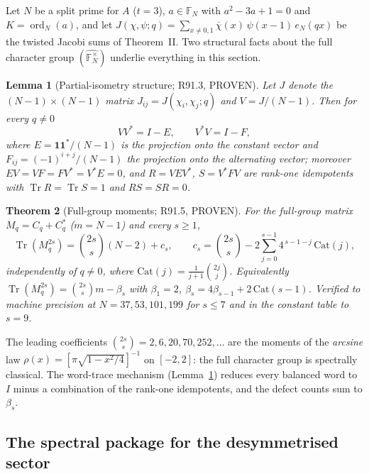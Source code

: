 \documentclass[11pt,reqno]{amsart}
\newtheorem{theorem}{Theorem}[section]
\newtheorem{lemma}[theorem]{Lemma}
\theoremstyle{definition}
\begin{document}
Let $N$ be a split prime for $A$ ($t=3$), $a \in \mathbb{F}_N$ with
$a^2 - 3a + 1 = 0$ and $K = \operatorname{ord}_N(a)$, and let
$J(\chi,\psi;q) = \sum_{x \neq 0,1} \overline{\chi}(x)\,\psi(x-1)\,e_N(qx)$
be the twisted Jacobi sums of Theorem~II.  Two structural facts about the
full character group $(\widehat{\mathbb{F}_N^\times})$ underlie everything
in this section.

\begin{lemma}[Partial-isometry structure; R91.3, PROVEN]
\label{lem:partialisometry}
Let $J$ denote the $(N{-}1)\times(N{-}1)$ matrix $J_{ij} = J(\chi_i,\chi_j;q)$
and $V = J/(N{-}1)$.  Then for every $q \neq 0$
\[
  V V^{*} = I - E, \qquad V^{*} V = I - F,
\]
where $E = \mathbf{1}\mathbf{1}^{*}/(N{-}1)$ is the projection onto the
constant vector and $F_{ij} = (-1)^{i+j}/(N{-}1)$ the projection onto the
alternating vector; moreover $EV = VF = FV^{*} = V^{*}E = 0$, and
$R = VEV^{*}$, $S = V^{*}FV$ are rank-one idempotents with
$\operatorname{Tr} R = \operatorname{Tr} S = 1$ and $RS = SR = 0$.
\end{lemma}

\begin{theorem}[Full-group moments; R91.5, PROVEN]
\label{thm:fullgroupmoments}
For the full-group matrix $M_q = C_q + C_q^{*}$ ($m = N{-}1$) and every
$s \ge 1$,
\[
  \operatorname{Tr}(M_q^{2s}) = \binom{2s}{s}(N{-}2) + c_s,
  \qquad
  c_s = \binom{2s}{s} - 2\sum_{j=0}^{s-1} 4^{\,s-1-j}\,\mathrm{Cat}(j),
\]
independently of $q \neq 0$, where $\mathrm{Cat}(j) = \frac{1}{j+1}\binom{2j}{j}$.
Equivalently $\operatorname{Tr}(M_q^{2s}) = \binom{2s}{s} m - \beta_s$ with
$\beta_1 = 2$, $\beta_s = 4\beta_{s-1} + 2\,\mathrm{Cat}(s-1)$.
Verified to machine precision at $N = 37, 53, 101, 199$ for $s \le 7$ and
in the constant table to $s = 9$.
\end{theorem}

The leading coefficients $\binom{2s}{s} = 2, 6, 20, 70, 252, \dots$ are the
moments of the \emph{arcsine} law $\rho(x) = [\pi\sqrt{1 - x^2/4}]^{-1}$ on
$[-2,2]$: the full character group is spectrally classical.  The word-trace
mechanism (Lemma~\ref{lem:partialisometry}) reduces every balanced word to
$I$ minus a combination of the rank-one idempotents, and the defect counts
sum to $\beta_s$.

\subsection{The spectral package for the desymmetrised sector}
\label{sec:spectralpackage}
\end{document}
